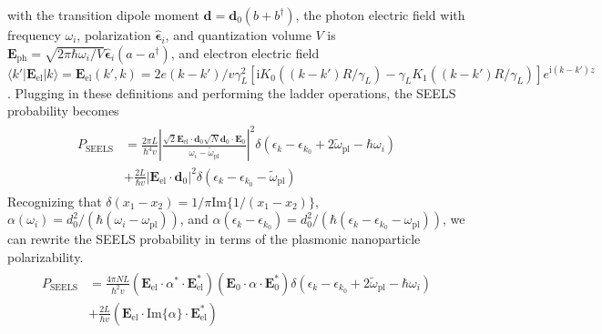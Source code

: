 \documentclass [11pt, proquest] {uwthesis}[2016/11/22]
\begin{document}
with the transition dipole moment $\textbf{d} = \textbf{d}_0(b + b^{\dagger})$, the photon electric field with frequency $\omega_i$, polarization $\hat{\boldsymbol{\epsilon}}_i$, and quantization volume $V$ is $\textbf{E}_{\textrm{ph}} = \sqrt{2\pi\hbar\omega_i/V}\hat{\boldsymbol{\epsilon}}_i(a - a^{\dagger})$, and electron electric field $\langle k'|\textbf{E}_{\textrm{el}}|k\rangle = \textbf{E}_{\textrm{el}}(k',k) = 2e(k-k')/v\gamma_L^2[\textrm{i}K_0((k-k') R/\gamma_L)-\gamma_LK_1((k-k') R/\gamma_L)]e^{\textrm{i}(k-k') z}$. Plugging in these definitions and performing the ladder operations, the SEELS probability becomes
\begin{align}
\begin{split}
  P_{\textrm{SEELS}} &= \frac{2\pi L}{\hbar^4v}\left|\frac{\sqrt{2}\textbf{E}_{\textrm{el}}\cdot\textbf{d}_0 \sqrt{N}\textbf{d}_0\cdot\textbf{E}_{0}}{\omega_i - \tilde{\omega}_{\textrm{pl}}}\right|^2\delta(\epsilon_k - \epsilon_{k_0} + 2\tilde{\omega}_{\textrm{pl}} - \hbar\omega_i)\\
  &+ \frac{2L}{\hbar v}|\textbf{E}_{\textrm{el}}\cdot\textbf{d}_0|^2\delta(\epsilon_k - \epsilon_{k_0} - \tilde{\omega}_{\textrm{pl}})
  \label{change_eels}
  \end{split}
\end{align}
Recognizing that $\delta(x_1 - x_2) = 1/\pi\textrm{Im}\{1/(x_1-x_2)\}$, $\alpha(\omega_i) = d_0^2/(\hbar(\omega_i-\omega_{\textrm{pl}}))$, and $\alpha(\epsilon_k-\epsilon_{k_0}) = d_0^2/(\hbar(\epsilon_k-\epsilon_{k_0}-\omega_{\textrm{pl}}))$, we can rewrite the SEELS probability in terms of the plasmonic nanoparticle polarizability.
\begin{align}
\begin{split}
  P_{\textrm{SEELS}} &= \frac{4\pi NL}{\hbar^2v}(\textbf{E}_{\textrm{el}}\cdot\alpha^*\cdot\textbf{E}_{\textrm{el}}^*)(\textbf{E}_0\cdot\alpha\cdot\textbf{E}_0^*)\delta(\epsilon_k - \epsilon_{k_0} + 2\tilde{\omega}_{\textrm{pl}} - \hbar\omega_i)\\
  &+ \frac{2L}{\hbar v}(\textbf{E}_{\textrm{el}}\cdot\textrm{Im}\{\alpha\}\cdot\textbf{E}_{\textrm{el}}^*)
  \label{seels_with_polar}
  \end{split}
\end{align}
\end{document}
